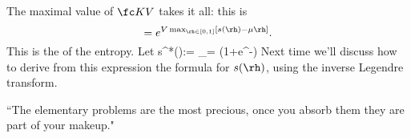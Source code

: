 The maximal value of $\fc KV$ takes it all: this is
\[
=e^{V\max_{\rh\in [0,1]}[s(\rh)-\mu\rh]}.
\]
This is the  of the entropy.
Let
s^*(\mu):= \max_\rh [s(\rh) - \mu\rh] = \ln (1+e^{-\mu})
\eeq
Next time we'll discuss how to derive from this expression the formula for $s(\rh)$, using the inverse Legendre transform.

``The elementary problems are the most precious, once you absorb them they are part of your makeup."